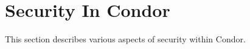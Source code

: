 \section{Security In Condor}
\label{sec:Security}

This section describes various aspects of security within Condor.






